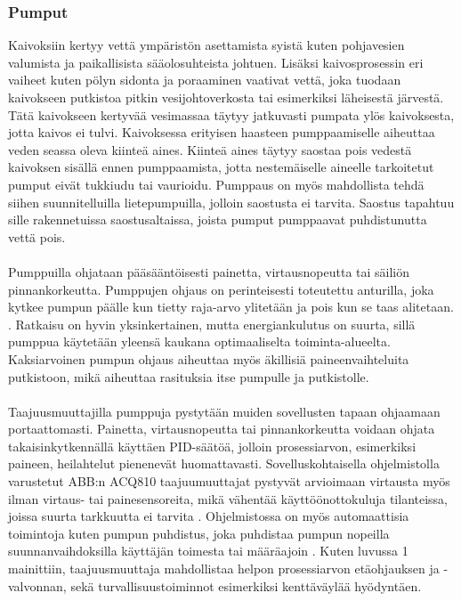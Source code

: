 \documentclass[finnish,12pt,a4paper,pdftex,elec,utf8]{aaltothesis}
\begin{document}
\subsubsection{Pumput}
Kaivoksiin kertyy vettä ympäristön asettamista syistä kuten pohjavesien valumista ja paikallisista sääolosuhteista johtuen. Lisäksi kaivosprosessin eri vaiheet kuten pölyn sidonta ja poraaminen vaativat vettä, joka tuodaan kaivokseen putkistoa pitkin vesijohtoverkosta tai esimerkiksi läheisestä järvestä. Tätä kaivokseen kertyvää vesimassaa täytyy jatkuvasti pumpata ylös kaivoksesta, jotta kaivos ei tulvi. Kaivoksessa erityisen haasteen pumppaamiselle aiheuttaa veden seassa oleva kiinteä aines. Kiinteä aines täytyy saostaa pois vedestä kaivoksen sisällä ennen pumppaamista, jotta nestemäiselle aineelle tarkoitetut pumput eivät tukkiudu tai vaurioidu. Pumppaus on myös mahdollista tehdä siihen suunnitelluilla lietepumpuilla, jolloin saostusta ei tarvita. Saostus tapahtuu sille rakennetuissa saostusaltaissa, joista pumput pumppaavat puhdistunutta vettä pois. \cite[s. 307]{Hakapää}
\\\\
Pumppuilla ohjataan pääsääntöisesti painetta, virtausnopeutta tai säiliön pinnankorkeutta. Pumppujen ohjaus on perinteisesti toteutettu anturilla, joka kytkee pumpun päälle kun tietty raja-arvo ylitetään ja pois kun se taas alitetaan. \cite[s. 315]{Hakapää}. Ratkaisu on hyvin yksinkertainen, mutta energiankulutus on suurta, sillä pumppua käytetään yleensä kaukana optimaaliselta toiminta-alueelta. Kaksiarvoinen pumpun ohjaus aiheuttaa myös äkillisiä paineenvaihteluita putkistoon, mikä aiheuttaa rasituksia itse pumpulle ja putkistolle.
\\\\
Taajuusmuuttajilla pumppuja pystytään muiden sovellusten tapaan ohjaamaan portaattomasti. Painetta, virtausnopeutta tai pinnankorkeutta voidaan ohjata takaisinkytkennällä käyttäen PID-säätöä, jolloin prosessiarvon, esimerkiksi paineen, heilahtelut pienenevät huomattavasti. Sovelluskohtaisella ohjelmistolla varustetut ABB:n ACQ810 taajuumuuttajat pystyvät arvioimaan virtausta myös ilman virtaus- tai painesensoreita, mikä vähentää käyttöönottokuluja tilanteissa, joissa suurta tarkkuutta ei tarvita \cite{ACQ810}. Ohjelmistossa on myös automaattisia toimintoja kuten pumpun puhdistus, joka puhdistaa pumpun nopeilla suunnanvaihdoksilla käyttäjän toimesta tai määräajoin \cite{ACQ810}. Kuten luvussa 1 mainittiin, taajuusmuuttaja mahdollistaa helpon prosessiarvon etäohjauksen ja -valvonnan, sekä turvallisuustoiminnot esimerkiksi kenttäväylää hyödyntäen.
\end{document}
